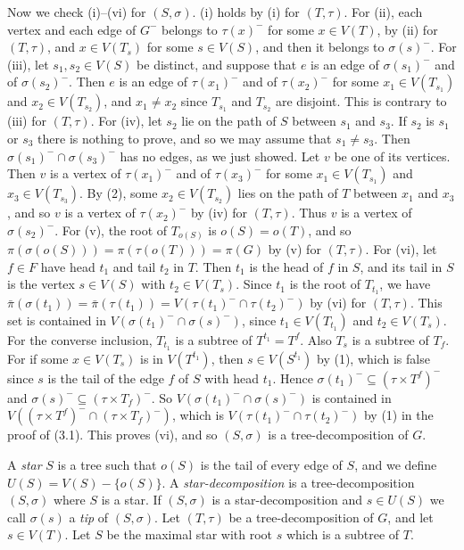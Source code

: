 {Now we check (i)--(vi) for $(S, \sigma)$. (i) holds by (i) for $(T, \tau)$. For (ii), each vertex and each edge of $G^-$ belongs to $\tau(x)^-$ for some
$x \in V(T)$, by (ii) for $(T, \tau)$, and $x \in V(T_s)$ for some $s \in V(S)$, and then it belongs
to $\sigma(s)^-$. For (iii), let $s_1, s_2 \in V(S)$ be distinct, and suppose that $e$ is an edge of
$\sigma(s_1)^-$ and of $\sigma(s_2)^-$. Then $e$ is an edge of $\tau(x_1)^-$ and of $\tau(x_2)^-$
for some $x_1 \in V(T_{s_1})$ and $x_2 \in V(T_{s_2})$, and $x_1 \ne x_2$ since $T_{s_1}$ and
$T_{s_2}$ are disjoint. This is contrary to (iii) for $(T, \tau)$. For (iv), let $s_2$ lie on the
path of $S$ between $s_1$ and $s_3$. If $s_2$ is $s_1$ or $s_3$ there is nothing to prove, and so we
may assume that $s_1 \ne s_3$. Then $\sigma(s_1)^- \cap \sigma(s_3)^-$ has no edges, as we just
showed. Let $v$ be one of its vertices. Then $v$ is a vertex of $\tau(x_1)^-$ and of $\tau(x_3)^-$
for some $x_1 \in V(T_{s_1})$ and $x_3 \in V(T_{s_3})$. By (2), some $x_2 \in V(T_{s_2})$ lies on
the path of $T$ between $x_1$ and $x_3$, and so $v$ is a vertex of $\tau(x_2)^-$ by (iv) for
$(T, \tau)$. Thus $v$ is a vertex of $\sigma(s_2)^-$. For (v), the root of $T_{o(S)}$ is
$o(S) = o(T)$, and so $\pi(\sigma(o(S))) = \pi(\tau(o(T))) = \pi(G)$ by (v) for $(T, \tau)$.
For (vi), let $f \in F$ have head $t_1$ and tail $t_2$ in $T$. Then $t_1$ is the head of $f$ in $S$,
and its tail in $S$ is the vertex $s \in V(S)$ with $t_2 \in V(T_s)$. Since $t_1$ is the root of
$T_{t_1}$, we have $\bar{\pi}(\sigma(t_1)) = \bar{\pi}(\tau(t_1)) = V(\tau(t_1)^- \cap \tau(t_2)^-)$
by (vi) for $(T, \tau)$. This set is contained in $V(\sigma(t_1)^- \cap \sigma(s)^-)$, since
$t_1 \in V(T_{t_1})$ and $t_2 \in V(T_s)$. For the converse inclusion, $T_{t_1}$ is a subtree of
$T^{t_1} = T^f$. Also $T_s$ is a subtree of $T_f$. For if some $x \in V(T_s)$ is in $V(T^{t_1})$,
then $s \in V(S^{t_1})$ by (1), which is false since $s$ is the tail of the edge $f$ of $S$ with
head $t_1$. Hence $\sigma(t_1)^- \subseteq (\tau \times T^f)^-$ and
$\sigma(s)^- \subseteq (\tau \times T_f)^-$. So $V(\sigma(t_1)^- \cap \sigma(s)^-)$ is
contained in $V((\tau \times T^f)^- \cap (\tau \times T_f)^-)$, which is
$V(\tau(t_1)^- \cap \tau(t_2)^-)$ by (1) in the proof of (3.1). This proves
(vi), and so $(S, \sigma)$ is a tree-decomposition of $G$.}

A \textit{star} $S$ is a tree such that $o(S)$ is the tail of every edge of $S$, and we define $U(S) = V(S) - \{o(S)\}$. A \textit{star-decomposition} is a tree-decomposition $(S, \sigma)$ where $S$ is a star. If $(S, \sigma)$ is a star-decomposition and $s \in U(S)$ we call $\sigma(s)$ a \textit{tip} of $(S, \sigma)$. Let $(T, \tau)$ be a tree-decomposition of $G$, and let $s \in V(T)$. Let $S$ be the maximal star with root $s$ which is a subtree of $T$.
